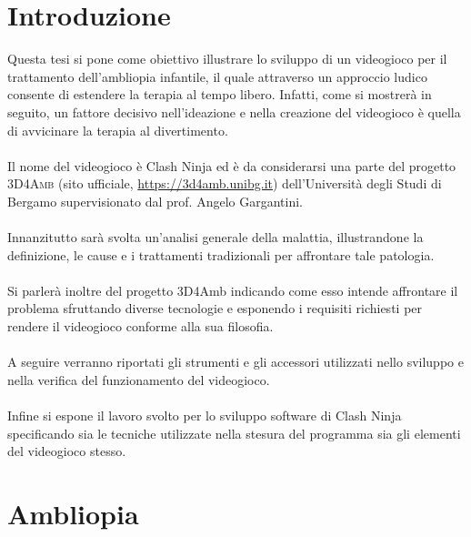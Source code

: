 \documentclass[12pt,a4paper,openright,twoside]{book}
\begin{document}
    
    \newpage
    \thispagestyle{empty}
    \tableofcontents %
    \newpage
    \thispagestyle{empty}
    \chapter*{Introduzione}
    Questa tesi si pone come obiettivo illustrare lo sviluppo di un videogioco per il trattamento dell'ambliopia infantile, il quale attraverso un approccio ludico consente di estendere la terapia al tempo libero. Infatti, come si mostrerà in seguito, un fattore 
    decisivo nell'ideazione e nella creazione del videogioco è quella di avvicinare la terapia al divertimento.  \\\\
    Il nome del videogioco è Clash Ninja ed è da considerarsi una parte del progetto \textsc{3D4Amb} (sito ufficiale, \url{https://3d4amb.unibg.it}) dell'Università degli Studi di Bergamo supervisionato dal prof. Angelo Gargantini. \\\\
    Innanzitutto sarà svolta un’analisi generale della malattia, illustrandone la definizione, le cause e i trattamenti tradizionali per affrontare tale patologia.\\\\
    Si parlerà inoltre del progetto 3D4Amb indicando come esso intende affrontare il problema sfruttando diverse tecnologie e 
    esponendo i requisiti richiesti per rendere il videogioco conforme alla sua filosofia.\\\\
    A seguire verranno riportati gli strumenti e gli accessori utilizzati nello sviluppo e nella verifica del funzionamento del videogioco. \\\\
    Infine si espone il lavoro svolto per lo sviluppo software di Clash Ninja specificando sia le tecniche utilizzate nella stesura del programma sia gli elementi del videogioco stesso.
    
    \newpage  
    \thispagestyle{empty}
    
    
    \chapter{Ambliopia}
\end{document}
